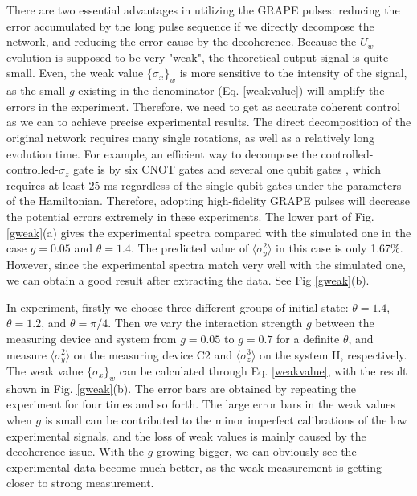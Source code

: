 \documentclass[prl,twocolumn,showpacs]{revtex4}
\begin{document}
There are two essential advantages in utilizing the GRAPE pulses: reducing the error accumulated by the long pulse sequence if we directly decompose the network, and reducing the error cause by the decoherence. Because the $U_w$ evolution is supposed to be very "weak", the theoretical output signal is quite small. Even, the weak value $\{ \sigma_x \}_w$ is more sensitive to the intensity of the signal, as the small $g$ existing in the denominator (Eq. \ref{weakvalue}) will amplify the errors in the experiment. Therefore, we need to get as accurate coherent control as we can to achieve precise experimental results. The direct decomposition of the original network requires many single rotations, as well as a relatively long evolution time. For example, an efficient way to decompose the controlled-controlled-$\sigma_z$ gate is by six CNOT gates and several one qubit gates \cite{chuangbook}, which requires at least 25 ms regardless of the single qubit gates under the parameters of the Hamiltonian. Therefore, adopting high-fidelity GRAPE pulses will decrease the potential errors extremely in these experiments. The lower part of Fig. \ref{gweak}(a) gives the experimental spectra compared with the simulated one in the case $g=0.05$ and $\theta = 1.4$. The predicted value of $\langle \sigma_y^2 \rangle$ in this case is only 1.67\%. However, since the experimental spectra match very well with the simulated one, we can obtain a good result after extracting the data. See Fig \ref{gweak}(b).

In experiment, firstly we choose three different groups of initial state: $\theta = 1.4$, $\theta = 1.2$, and $\theta =\pi/4$. Then we vary the interaction strength $g$ between the measuring device and system from $g=0.05$ to $g = 0.7$ for a definite $\theta$, and measure $\langle \sigma_y^2 \rangle$ on the measuring device C2 and $\langle \sigma_z^3 \rangle$ on the system H, respectively. The weak value $\{ \sigma_x \}_w$ can be calculated through Eq. \ref{weakvalue}, with the result shown in Fig. \ref{gweak}(b). The error bars are obtained by repeating the experiment for four times and so forth. The large error bars in the weak values when $g$ is small can be contributed to the minor imperfect calibrations of the low experimental signals, and the loss of weak values is mainly caused by the decoherence issue. With the $g$ growing bigger, we can obviously see the experimental data become much better, as the weak measurement is getting closer to strong measurement. 
\end{document}

